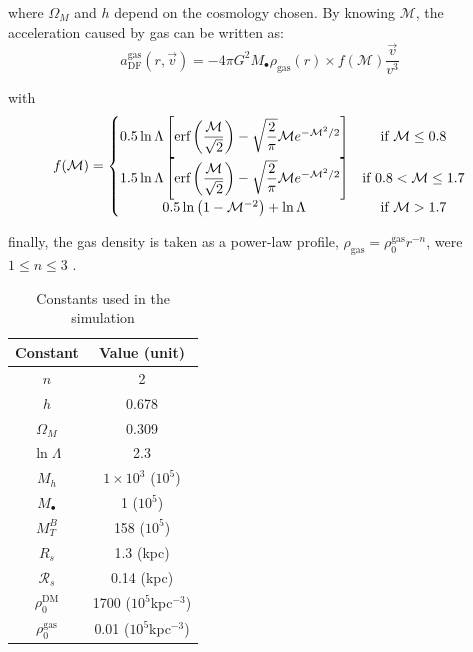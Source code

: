 		 where $\Omega_M$ and $h$ depend on the cosmology chosen. By knowing $\mathcal{M}$, the acceleration caused by gas can be written as:
		 \begin{equation}
		 	a^\text{gas}_\text{DF}(r, \vec{v}) = -4\pi G^2M_\bullet\rho_\text{gas}(r)\times f(\mathcal{M})\dfrac{\vec{v}}{v^3}
		 \end{equation}
		 
		 with
		 \begin{equation}
		 	f(\mathcal{M}) = \left\{
			\begin{matrix}
			0.5\ln\Lambda \left[\text{erf}\left(\dfrac{\mathcal{M}}{\sqrt{2}}\right) - \sqrt{\dfrac{2}{\pi}}\mathcal{M}e^{-\mathcal{M}^2/2}\right]& \text{if $\mathcal{M} \leq 0.8$}\\
			1.5\ln\Lambda \left[\text{erf}\left(\dfrac{\mathcal{M}}{\sqrt{2}}\right) - \sqrt{\dfrac{2}{\pi}}\mathcal{M}e^{-\mathcal{M}^2/2}\right] & \text{if $0.8 < \mathcal{M} \leq 1.7$}\\
			0.5\ln\left(1 - \mathcal{M}^{-2}\right) + \ln\Lambda & \text{if $\mathcal{M} > 1.7$}
			\end{matrix}
			\right.
		 \end{equation}
		 
		 finally, the gas density is taken as a power-law profile, $\rho_\text{gas}=\rho_0^\text{gas}r^{-n}$, were $1 \leq n \leq 3$ \cite{choksi2017recoiling}.
	
		\begin{table}[h]
			\centering
			\caption{Constants used in the simulation}
			\begin{tabular}{c|c}
				\hline
				\textbf{Constant} & \textbf{Value (unit)} \\
				\hline
				$n$ & 2\\
				$h$ & 0.678 \\
				$\Omega_M$ & 0.309 \\
				$\ln\Lambda$ & 2.3 \\
				$M_h$ & $1\times10^3$ ($10^5$\sm) \\
				$M_\bullet$ & 1 ($10^5$\sm) \\
				$M_T^B$ & 158 ($10^5$\sm) \\
				$R_s$ & 1.3 (kpc) \\
				$\mathcal{R}_s$ & 0.14 (kpc) \\
				$\rho_0^\text{DM}$ & 1700 ($10^5$\sm kpc$^{-3}$)\\
				$\rho_0^\text{gas}$ & 0.01 ($10^5$\sm kpc$^{-3}$)\\
				\hline
			\end{tabular}
		\end{table}
	
